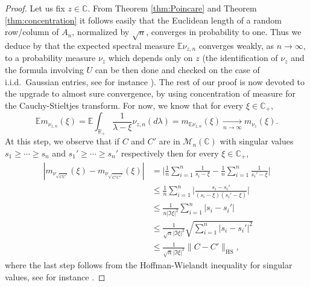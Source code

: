\documentclass[12pt,reqno]{amsart}
\begin{document}
\begin{proof}
  Let us fix $z\in{\mathbb{C}}$. From Theorem \ref{thm:Poincare} and Theorem
  \ref{thm:concentration} it follows easily that the Euclidean length of a
  random row/column of $A_n$, normalized by $\sqrt{n}$, converges in
  probability to one. Thus we deduce by \cite[Theorem 2.4]{CircLawUnc} that
  the expected spectral measure ${\mathbb{E}} \nu_{z,n}$ converges weakly, as
  $n\to\infty$, to a probability measure $\nu_z$ which depends only on $z$
  (the identification of $\nu_z$ and the formula involving $U$ can be then
  done and checked on the case of i.i.d.\ Gaussian entries, see for instance
  \cite{BCAround}). The rest of our proof is now devoted to the upgrade to
  almost sure convergence, by using concentration of measure for the
  Cauchy-Stieltjes transform. For now, we know that for every $\xi\in{\mathbb{C}}_+$,
  \[
  {\mathbb{E}} m_{\nu_{z,n}}(\xi)   = {\mathbb{E}} \int_{{\mathbb{R}}_+} \frac{1}{\lambda - \xi} \nu_{z,n}(d\lambda)   = m_{{\mathbb{E}} \nu_{z,n}}(\xi)   \underset{n\to\infty}{\longrightarrow} m_{\nu_z}(\xi).
  \]
  At this step, we observe that if $C$ and $C'$ are in $\mathcal{M}_n({\mathbb{C}})$
  with singular values $s_1\geq\cdots\geq s_n$ and $s_1'\geq\cdots\geq s_n'$
  respectively then for every $\xi\in{\mathbb{C}}_+$,
  \begin{align*}
    |m_{\nu_{\sqrt{CC^*}}}(\xi)-m_{\nu_{\sqrt{C'C'^*}}}(\xi)| &=
    \Big|\frac{1}{n}\sum_{i=1}^{n} \frac{1}{s_i - \xi} -
    \frac{1}{n}\sum_{i=1}^{n}\frac{1}{s_i'-\xi}\Big| \\%
    &\le \frac{1}{n}\sum_{i=1}^{n}    \Big|\frac{s_i- s_i'}{(s_i - \xi)(s_i'-\xi)}\Big| \\
    &\le\frac{1}{n|\Im \xi|^2}\sum_{i=1}^{n}|s_i-s_i'|\\
    &\le\frac{1}{\sqrt{n}|\Im \xi|^2}\sqrt{\sum_{i=1}^{n}|s_i-s_i'|^2}\\
    &\le\frac{1}{\sqrt{n}|\Im \xi|^2}\|C-C'\|_{\mathrm{HS}},
  \end{align*}
  where the last step follows from the Hoffman-Wielandt inequality for
  singular values, see for instance \cite[Chapter 4]{lamabook}.
  

\end{proof}
\end{document}
